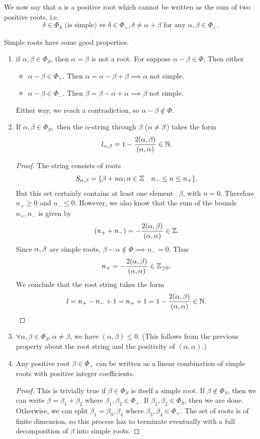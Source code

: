 \begin{defn}
We now say that a  is a positive root which cannot be written as the sum of two positive roots, i.e.
$$\delta \in \Phi_S \text{ (is simple)} \iff \delta \in \Phi_+, \delta \neq \alpha+\beta \text{ for any } \alpha,\beta \in \Phi_+.$$
\end{defn}
Simple roots have some good properties.
\begin{enumerate}
    \item if $\alpha,\beta\in \Phi_S$, then $\alpha=\beta$ is not a root. For suppose $\alpha-\beta\in \Phi$. Then either
    \begin{itemize}
        \item $\alpha-\beta \in \Phi_+$. Then $\alpha=\alpha-\beta+\beta \implies \alpha$ not simple.
        \item $\alpha-\beta \in\Phi_-$. Then $\beta=\beta-\alpha+\alpha \implies \beta$ not simple.
    \end{itemize}
    Either way, we reach a contradiction, so $\alpha-\beta\notin \Phi.$
    \item If $\alpha,\beta \in \Phi_S,$ then the $\alpha$-string through $\beta$ ($\alpha\neq \beta$) takes the form
    $$l_{\alpha,\beta}=1-\frac{2(\alpha,\beta)}{(\alpha,\alpha)}\in \mathbb{N}.$$
    \begin{proof} The string consists of roots
    $$S_{\alpha,\beta}=\{\beta+n\alpha;n\in \mathbb{Z}\quad n_- \leq n \leq n_+\}.$$
    But this set certainly contains at least one element-- $\beta$, with $n=0$. Therefore $n_+\geq 0$ and $n_-\leq 0$. However, we also know that the sum of the bounds $n_+,n_-$ is given by 
    $$(n_++n_-)=-\frac{2(\alpha,\beta)}{(\alpha,\alpha)}\in \mathbb{Z}.$$
    Since $\alpha,\beta$ are simple roots, $\beta-\alpha \notin \Phi \implies n_- =0$. Thus
    $$n_+ = -\frac{2(\alpha,\beta)}{(\alpha,\alpha)}\in \mathbb{Z}_{\geq 0}.$$
    We conclude that the root string takes the form
    $$l=n_+ - n_- + 1 = n_+ +1 = 1-\frac{2(\alpha,\beta)}{(\alpha,\alpha)} \in \mathbb{N}.$$
    \end{proof}
    \item $\forall \alpha,\beta \in \Phi_S, \alpha \neq \beta$, we have $(\alpha,\beta)\leq 0$. (This follows from the previous property about the root string and the positivity of $(\alpha,\alpha)$.)
    \item Any positive root $\beta\in \Phi_+$ can be written as a linear combination of simple roots with positive integer coefficients.
    \begin{proof}
    This is trivially true if $\beta\in \Phi_S$ is itself a simple root. If $\beta\notin \Phi_S$, then we can write $\beta=\beta_1+\beta_2$ where $\beta_1,\beta_2 \in \Phi_+.$ If $\beta_1,\beta_2\in \Phi_S$, then we are done. Otherwise, we can split $\beta_1=\beta_3,\beta_4$ where $\beta_3,\beta_4\in \Phi_+$. The set of roots is of finite dimension, so this process has to terminate eventually with a full decomposition of $\beta$ into simple roots.

\end{proof}
\end{enumerate}

